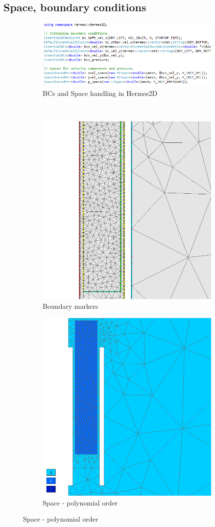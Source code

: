 \documentclass{beamer}
\begin{document}
\subsection{Space, boundary conditions}
\begin{frame}
	\begin{figure}[H]
		\centering
		\begin{subfigure}{0.9\textwidth}
			\centering
			\includegraphics[width=.69\textwidth]{codeimg/spaceBcs.png}
			\vspace{-3mm}
			\caption{BCs and Space handling in Hermes2D}
		\end{subfigure}
		\ \\
		\begin{subfigure}{.47\textwidth}
		\centering
			\includegraphics[width=.6\textwidth]{screenshots/bcs.png}
			\caption{Boundary markers}
		\end{subfigure}
		\begin{subfigure}{.47\textwidth}
		\centering
			\includegraphics[width=.6\textwidth]{screenshots/space.png}
			\caption{Space - polynomial order}
		\end{subfigure}
	\end{figure}
\end{frame}
\end{document}
